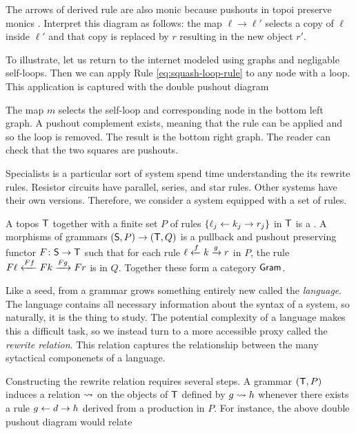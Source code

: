 \documentclass{amsart}
\begin{document}
The arrows of derived rule are also monic because pushouts
in topoi preserve monics
\cite[Lem.~12]{lack-sobo_adhesive-cats}. Interpret this
diagram as follows: the map $ \ell \to \ell' $ selects a
copy of $ \ell $ inside $ \ell' $ and that copy is replaced
by $ r $ resulting in the new object $ r' $. 

To illustrate, let us return to the internet modeled using
graphs and negligable self-loops.  Then we can
apply Rule \eqref{eq:squash-loop-rule} to any node with a
loop. This application is captured with the double pushout
diagram 

The map $ m $ selects the self-loop and corresponding node
in the bottom left graph. A pushout complement exists,
meaning that the rule can be applied and so the loop is
removed. The result is the bottom right graph.  The reader
can check that the two squares are pushouts.

Specialists is a particular sort of system spend time
understanding the its rewrite rules. Resistor circuits have
parallel, series, and star rules. Other systems have their
own versions. Therefore, we consider a system equipped with
a set of rules. 

\begin{definition}[Grammar] \label{def:grammar} A topos
  $ \mathsf{T} $ together with a finite set $ P $ of rules
  $ \{ \ell_j \leftarrow k_j \to r_j \} $ in $ \mathsf{T} $ is a
  . A morphisms of grammars
  $ ( \mathsf{S} , P ) \to ( \mathsf{T} , Q ) $ is a pullback and pushout
  preserving functor $ F \colon \mathsf{S} \to \mathsf{T} $ such that for
  each rule $ \ell \xleftarrow{f} k \xrightarrow{g} r $ in $ P $, the rule
  $ F\ell \xleftarrow{Ff} Fk \xrightarrow{Fg} Fr $ is in $ Q $. Together
  these form a category $ \mathsf{Gram} $.
\end{definition}

Like a seed, from a grammar grows something entirely new
called the \emph{language}. The language contains all necessary
information about the syntax of a system, so naturally, it
is the thing to study. The potential complexity of a
language makes this a difficult task, so we instead turn to
a more accessible proxy called the \emph{rewrite
  relation}. This relation captures the relationship between
the many sytactical componenets of a language.  

Constructing the rewrite relation requires several steps.  A
grammar $ ( \mathsf{T} , P ) $ induces a relation
$ \rightsquigarrow $ on the objects of $ \mathsf{T} $ defined by
$ g \rightsquigarrow h $ whenever there exists a rule
$ g \leftarrow d \to h $ derived from a production in $ P $. For
instance, the above double pushout diagram would relate

\end{document}
